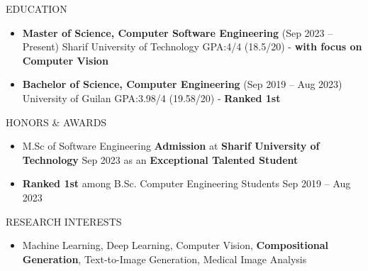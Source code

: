 \documentclass[]{CV}
\begin{document}
\resumeheader
{}
{}
{}
{}
{}



\vspace{-2mm}
\begin{section}{EDUCATION}
\begin{itemize}
\item \textbf{Master of Science, Computer Software Engineering} \hfill (Sep 2023 -- Present)\newline
{Sharif University of Technology \newline GPA:4/4 (18.5/20) - \textbf{with focus on Computer Vision}}

\item \textbf{Bachelor of Science, Computer Engineering} \hfill (Sep 2019 -- Aug 2023)\newline
{University of Guilan \newline GPA:3.98/4 (19.58/20) - \textbf{Ranked 1st}}
\end{itemize}
\end{section}

\vspace{-2mm}
\begin{section}{HONORS \& AWARDS}
\begin{itemize}
\item M.Sc of Software Engineering \textbf{Admission} at \textbf{Sharif University of Technology} \hfill Sep 2023
\newline as an \textbf{Exceptional Talented Student} 

\item \textbf{Ranked 1st} among B.Sc. Computer Engineering Students \hfill Sep 2019 -- Aug 2023 

\end{itemize}
\end{section}

\begin{section}{RESEARCH INTERESTS}
\begin{itemize}
 	\item Machine Learning, Deep Learning, Computer Vision, \textbf{Compositional Generation}, Text-to-Image Generation, Medical Image Analysis
\end{itemize}
\end{section}
\end{document}
